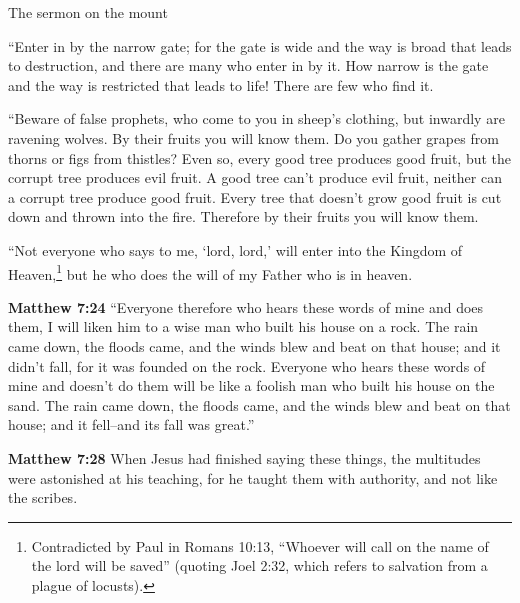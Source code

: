 \documentclass[10pt,twoside]{article} %
\newcommand{\quotesize}{\normalsize{}}
\newenvironment{quotetext}{\begingroup\quotesize}{\endgroup}
\newcommand{\intex}[1]{\index[texts]{#1}}
\newcommand{\bible}[2]{\begin{quotetext}\textbf{#1}\intex{#1} #2\end{quotetext}}
\newcommand{\matthew}[2]{\bible{Matthew #1}{#2}}
\begin{document}
\begin{section}{The sermon on the mount}
{   ``Enter in by the narrow gate; for the gate is wide and the way is broad that leads to destruction, and there are many who enter in by it.    How narrow is the gate and the way is restricted that leads to life! There are few who find it.

   ``Beware of false prophets, who come to you in sheep's clothing, but inwardly are ravening wolves.    By their fruits you will know them. Do you gather grapes from thorns or figs from thistles?    Even so, every good tree produces good fruit, but the corrupt tree produces evil fruit.    A good tree can't produce evil fruit, neither can a corrupt tree produce good fruit.    Every tree that doesn't grow good fruit is cut down and thrown into the fire.    Therefore by their fruits you will know them.

   ``Not everyone who says to me, `lord, lord,' will enter into the Kingdom of 
Heaven,\footnote{Contradicted by Paul in Romans 10:13, ``Whoever will call on the name of the lord will be saved''
(quoting Joel 2:32, which refers to salvation from a plague of locusts).\label{paul-contradicts-gospels}} but he who does the will of my Father who is in heaven.
}

\matthew{7:24}{
  ``Everyone therefore who hears these words of mine and does them, I will liken him to a wise man who built his house on a rock.    The rain came down, the floods came, and the winds blew and beat on that house; and it didn't fall, for it was founded on the rock.    Everyone who hears these words of mine and doesn't do them will be like a foolish man who built his house on the sand.    The rain came down, the floods came, and the winds blew and beat on that house; and it fell--and its fall was great.''
}

\matthew{7:28}{
  When Jesus had finished saying these things, the multitudes were astonished at his teaching,   for he taught them with authority, and not like the scribes.
}

\end{section}
\end{document}
